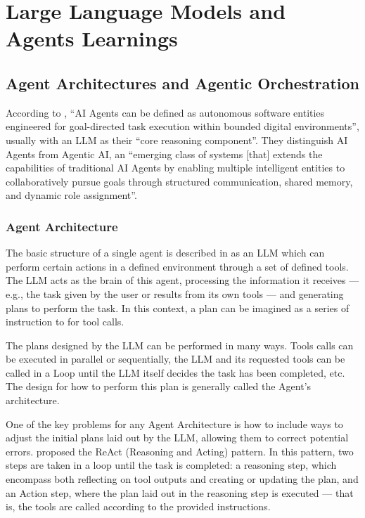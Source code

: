 \documentclass[a4paper]{report}
\begin{document}
\section{Large Language Models and Agents Learnings}
\label{sec:research-llms}

\subsection{Agent Architectures and Agentic Orchestration}

According to \cite{sapkota2025aiagentsvsagentic}, ``AI Agents can be defined as autonomous software entities engineered for goal-directed task execution within bounded digital environments'', usually with an LLM as their ``core reasoning component''. They distinguish AI Agents from Agentic AI, an ``emerging class of systems [that] extends the capabilities of traditional AI Agents by enabling multiple intelligent entities to collaboratively pursue goals through structured communication, shared memory, and dynamic role assignment''.

\subsubsection{Agent Architecture}

The basic structure of a single agent is described in \cite{aiebook2025} as an LLM which can perform certain actions in a defined environment through a set of defined tools. The LLM acts as the brain of this agent, processing the information it receives --- e.g., the task given by the user or results from its own tools --- and generating plans to perform the task. In this context, a plan can be imagined as a series of instruction to for tool calls.

The plans designed by the LLM can be performed in many ways. Tools calls can be executed in parallel or sequentially, the LLM and its requested tools can be called in a Loop until the LLM itself decides the task has been completed, etc. The design for how to perform this plan is generally called the Agent's architecture.

One of the key problems for any Agent Architecture is how to include ways to adjust the initial plans laid out by the LLM, allowing them to correct potential errors. \cite{yao2023react} proposed the ReAct (Reasoning and Acting) pattern. In this pattern, two steps are taken in a loop until the task is completed: a reasoning step, which encompass both reflecting on tool outputs and creating or updating the plan, and an Action step, where the plan laid out in the reasoning step is executed --- that is, the tools are called according to the provided instructions.
\end{document}
